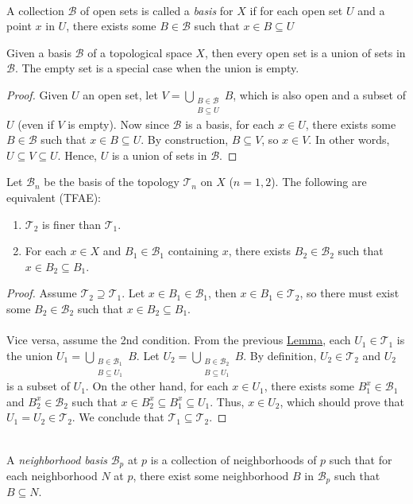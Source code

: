 \documentclass{treatise}
\begin{document}
\ \\
A collection $\mathcal{B}$ of open sets is called a \emph{basis} for $X$ if for each open set $U$ and a point $x$ in $U$, there exists some $B \in \mathcal{B}$ such that $x \in B \subseteq U$
\begin{lemma} \label{basis-union-prop}
Given a basis $\mathcal{B}$ of a topological space $X$, then every open set is a union of sets in $\mathcal{B}$. The empty set is a special case when the union is empty.
\end{lemma}
\begin{proof}
Given $U$ an open set, let $V = \bigcup_{\substack{B \in \mathcal{B} \\ B \subseteq U}} B$, which is also open and a subset of $U$ (even if $V$ is empty). Now since $\mathcal{B}$ is a basis, for each $x \in U$, there exists some $B \in \mathcal{B}$ such that $x \in B \subseteq U$. By construction, $B \subseteq V$, so $x \in V$. In other words, $U \subseteq V \subseteq U$. Hence, $U$ is a union of sets in $\mathcal{B}$.
\end{proof}
\begin{lemma} \label{topo-compare-basis}
Let $\mathcal{B}_n$ be the basis of the topology $\mathcal{T}_n$ on $X$ ($n = 1, 2$). The following are equivalent (TFAE):
\begin{enumerate}
    \item $\mathcal{T}_2$ is finer than $\mathcal{T}_1$.
    \item For each $x \in X$ and $B_1 \in \mathcal{B}_1$ containing $x$, there exists $B_2 \in \mathcal{B}_2$ such that $x \in B_2 \subseteq B_1$.
\end{enumerate}
\end{lemma}
\begin{proof}
Assume $\mathcal{T}_2 \supseteq \mathcal{T}_1$. Let $x \in B_1 \in \mathcal{B}_1$, then $x \in B_1 \in \mathcal{T}_2$, so there must exist some $B_2 \in \mathcal{B}_2$ such that $x \in B_2 \subseteq B_1$.
\\
\\
Vice versa, assume the 2nd condition. From the previous \hyperref[basis-union-prop]{Lemma}, each $U_1 \in \mathcal{T}_1$ is the union $U_1 = \bigcup_{\substack{B \in \mathcal{B}_1 \\ B \subseteq U_1}} B$. Let $U_2 = \bigcup_{\substack{B \in \mathcal{B}_2 \\ B \subseteq U_1}} B$. By definition, $U_2 \in \mathcal{T}_2$ and $U_2$ is a subset of $U_1$. On the other hand, for each $x \in U_1$, there exists some $B_1^x \in \mathcal{B}_1$ and $B_2^x \in \mathcal{B}_2$ such that $x \in B_2^x \subseteq B_1^x \subseteq U_1$. Thus, $x \in U_2$, which should prove that $U_1 = U_2 \in \mathcal{T}_2$. We conclude that $\mathcal{T}_1 \subseteq \mathcal{T}_2$.
\end{proof}
\ \\
A \emph{neighborhood basis} $\mathcal{B}_p$ at $p$ is a collection of neighborhoods of $p$ such that for each neighborhood $N$ at $p$, there exist some neighborhood $B$ in $\mathcal{B}_p$ such that $B \subseteq N$.
\end{document}
